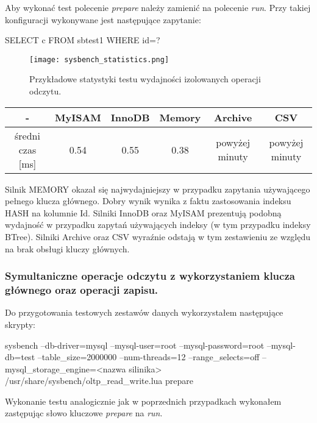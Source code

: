 Aby wykonać test polecenie \textit{prepare} należy zamienić na polecenie \textit{run}. Przy takiej konfiguracji wykonywane jest następujące zapytanie:
\begin{spverbatim}
	SELECT c FROM sbtest1 WHERE id=?
\end{spverbatim}
\begin{figure}[H]
	\caption{Przykładowe statystyki testu wydajności izolowanych operacji odczytu.}
	\centering
	\texttt{[image: sysbench\_statistics.png]}
	\label{fig:label}
\end{figure}
\begin{center}
	\begin{tabular}{ | c | c | c | c | c | c |}
		\hline
		- & MyISAM & InnoDB & Memory & Archive & CSV  \\ 
		\hline
		średni czas [ms] & 0.54 & 0.55 & 0.38 & powyżej minuty & powyżej minuty \\
		\hline
	\end{tabular}
\end{center}
Silnik MEMORY okazał się najwydajniejszy w przypadku zapytania używającego pełnego klucza głównego. Dobry wynik wynika z faktu zastosowania indeksu HASH na kolumnie Id. Silniki InnoDB oraz MyISAM prezentują podobną wydajność w przypadku zapytań używających indeksy (w tym przypadku indeksy BTree). Silniki Archive oraz CSV wyraźnie odstają w tym zestawieniu ze względu na brak obsługi kluczy głównych.


\subsubsection{Symultaniczne operacje odczytu z wykorzystaniem klucza głównego oraz operacji zapisu.}

Do przygotowania testowych zestawów danych wykorzystałem następujące skrypty:
\begin{spverbatim}
	sysbench --db-driver=mysql --mysql-user=root --mysql-password=root --mysql-db=test --table_size=2000000 --num-threads=12 --range_selects=off --mysql_storage_engine=<nazwa silinika>  /usr/share/sysbench/oltp_read_write.lua prepare
\end{spverbatim}

Wykonanie testu analogicznie jak w poprzednich przypadkach wykonałem zastępując słowo kluczowe \textit{prepare} na \textit{run}.

